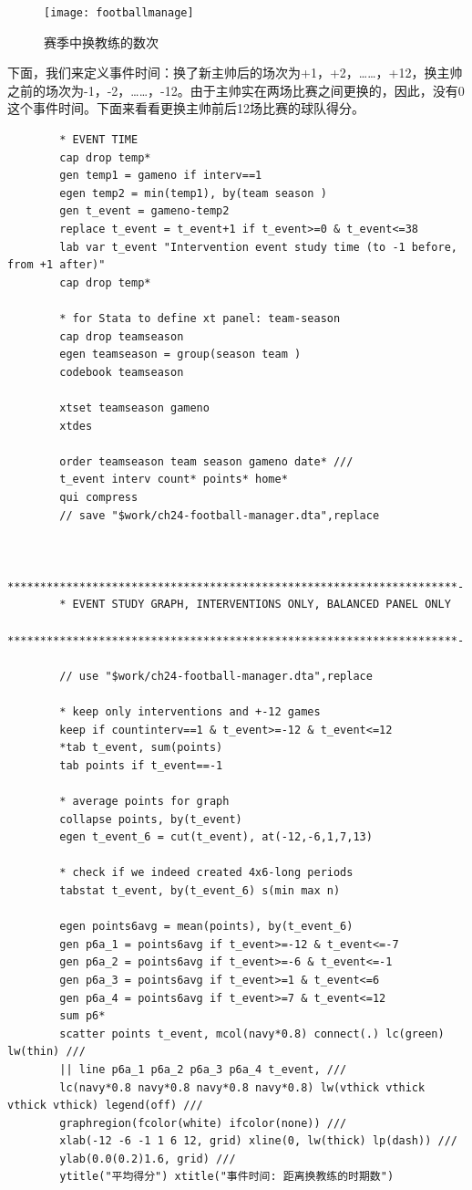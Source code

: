 \documentclass[cn,12pt,math=newtx,citestyle=gb7714-2015,bibstyle=gb7714-2015]{elegantbook}
\begin{document}
	    

\begin{figure}[tbph]
	\centering
	\texttt{[image: footballmanage]}
	\caption{赛季中换教练的数次}
	\label{fig:footballmanage}
\end{figure}
	    
	下面，我们来定义事件时间：换了新主帅后的场次为+1，+2，……，+12，换主帅之前的场次为-1，-2，……，-12。由于主帅实在两场比赛之间更换的，因此，没有0这个事件时间。下面来看看更换主帅前后12场比赛的球队得分。
	
	
	
	
	\begin{lstlisting}
		* EVENT TIME
		cap drop temp*
		gen temp1 = gameno if interv==1
		egen temp2 = min(temp1), by(team season )
		gen t_event = gameno-temp2
		replace t_event = t_event+1 if t_event>=0 & t_event<=38
		lab var t_event "Intervention event study time (to -1 before, from +1 after)"
		cap drop temp*
		
		* for Stata to define xt panel: team-season
		cap drop teamseason
		egen teamseason = group(season team )
		codebook teamseason
		
		xtset teamseason gameno
		xtdes
		
		order teamseason team season gameno date* ///
		t_event interv count* points* home*
		qui compress
		// save "$work/ch24-football-manager.dta",replace
		
		
		*********************************************************************-
		* EVENT STUDY GRAPH, INTERVENTIONS ONLY, BALANCED PANEL ONLY
		*********************************************************************-
		
		// use "$work/ch24-football-manager.dta",replace
		
		* keep only interventions and +-12 games
		keep if countinterv==1 & t_event>=-12 & t_event<=12
		*tab t_event, sum(points)
		tab points if t_event==-1
		
		* average points for graph
		collapse points, by(t_event)
		egen t_event_6 = cut(t_event), at(-12,-6,1,7,13)
		
		* check if we indeed created 4x6-long periods
		tabstat t_event, by(t_event_6) s(min max n)
		
		egen points6avg = mean(points), by(t_event_6)
		gen p6a_1 = points6avg if t_event>=-12 & t_event<=-7
		gen p6a_2 = points6avg if t_event>=-6 & t_event<=-1
		gen p6a_3 = points6avg if t_event>=1 & t_event<=6
		gen p6a_4 = points6avg if t_event>=7 & t_event<=12
		sum p6*
		scatter points t_event, mcol(navy*0.8) connect(.) lc(green) lw(thin) ///
		|| line p6a_1 p6a_2 p6a_3 p6a_4 t_event, ///
		lc(navy*0.8 navy*0.8 navy*0.8 navy*0.8) lw(vthick vthick vthick vthick) legend(off) ///
		graphregion(fcolor(white) ifcolor(none)) ///
		xlab(-12 -6 -1 1 6 12, grid) xline(0, lw(thick) lp(dash)) ///
		ylab(0.0(0.2)1.6, grid) ///
		ytitle("平均得分") xtitle("事件时间: 距离换教练的时期数")
		
	\end{lstlisting}
\end{document}
